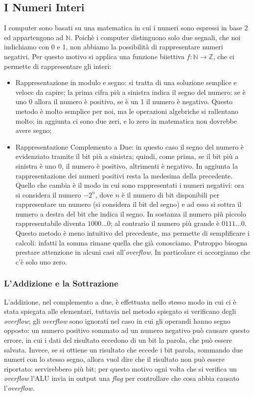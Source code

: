 \documentclass{article}
\begin{document}
\subsection{I Numeri Interi}

I computer sono basati su una matematica in cui i numeri sono espressi in base 2 ed appartengono ad $\mathbb{N}$. Poichè i computer distinguono solo due segnali, che noi indichiamo con 0 e 1, non abbiamo la possibilità di rappresentare numeri negativi. Per questo motivo si applica una funzione biiettiva $f:\mathbb{N}\rightarrow \mathbb{Z}$, che ci permette di rappresentare gli interi:
\begin{itemize}
	\item Rappresentazione in modulo e segno:
	si tratta di una soluzione semplice e veloce da capire; la prima cifra più a sinistra indica il segno del numero: se è uno 0 allora il numero è positivo, se è un 1 il numero è negativo. Questo metodo è molto semplice per noi, ma le operazioni algebriche si rallentano molto; in aggiunta ci sono due zeri, e lo zero in matematica non dovrebbe avere segno;

	\item Rappresentazione Complemento a Due:
	in questo caso il segno del numero è evidenziato tramite il bit più a sinistra; quindi, come prima, se il bit più a sinistra è uno 0, il numero è positivo, altrimenti è negativo. In aggiunta la rappresentazione dei numeri positivi resta la medesima della precedente. Quello che cambia è il modo in cui sono rappresentati i numeri negativi: ora si considera il numero $-2^{n}$, dove $n$ è il numero di bit disponibili per rappresentare un numero (si considera il bit del segno) e ad esso si sottra il numero a destra del bit che indica il segno. In sostanza il numero più piccolo rappresentabile diventa $1000 \dots 0$; al contrario il numero più grande è $0111 \dots 0$. Questo metodo è meno intuitivo del precedente, ma permette di semplificare i calcoli: infatti la somma rimane quella che già conosciamo. Putroppo bisogna prestare attenzione in alcuni casi all'\textit{overflow}. In particolare ci accorgiamo che c'è solo uno zero.
\end{itemize}

\subsubsection{L'Addizione e la Sottrazione}
\label{addsub}
L'addizione, nel complemento a due, è effettuata nello stesso modo in cui ci è stata spiegata alle elementari, tuttavia nel metodo spiegato si verificano degli \textit{overflow}; gli \textit{overflow} sono ignorati nel caso in cui gli operandi hanno segno opposto: un numero positivo sommato ad un numero negativo può causare questo errore, in cui i dati del risultato eccedono di un bit la parola, che può essere salvata. Invece, se si ottiene un risultato che eccede i bit parola, sommando due numeri con lo stesso segno, allora vuol dire che il risultato non può essere riportato: servirebbero più bit; per questo motivo ogni volta che si verifica un \textit{overflow} l'ALU invia in output una \textit{flag} per controllare che cosa abbia causato l'\textit{overflow}.
\end{document}
